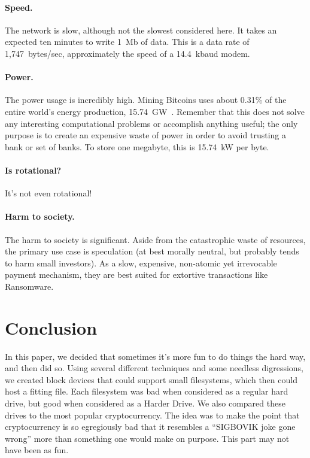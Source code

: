 \documentclass[twocolumn]{article}
\begin{document}
\paragraph{Speed.} The network is slow, although not the slowest considered
here. It takes an expected ten minutes to write 1~Mb of data. This is
a data rate of 1,747~bytes/sec, approximately the speed of a
14.4~kbaud modem.

\paragraph{Power.} The power usage is incredibly high. Mining Bitcoins
uses about 0.31\% of the entire world's energy production,
15.74~GW~\cite{cbeci}. Remember that this does not solve any
interesting computational problems or accomplish anything useful; the
only purpose is to create an expensive waste of power in order to
avoid trusting a bank or set of banks. To store one megabyte, this is
15.74~kW per byte.

\paragraph{Is rotational?} It's not even rotational!

\paragraph{Harm to society.} The harm to society is significant. Aside
from the catastrophic waste of resources, the primary use case is
speculation (at best morally neutral, but probably tends to harm small
investors). As a slow, expensive, non-atomic yet irrevocable payment
mechanism, they are best suited for extortive transactions like
Ransomware.

\section{Conclusion}

In this paper, we decided that sometimes it's more fun to do things
the hard way, and then did so. Using several different techniques and
some needless digressions, we created block devices that could support
small filesystems, which then could host a fitting file. Each
filesystem was bad when considered as a regular hard drive, but good
when considered as a Harder Drive. We also compared these drives to
the most popular cryptocurrency. The idea was to make the point that
cryptocurrency is so egregiously bad that it resembles a ``SIGBOVIK
joke gone wrong'' more than something one would make on purpose. This
part may not have been as fun.
\end{document}
